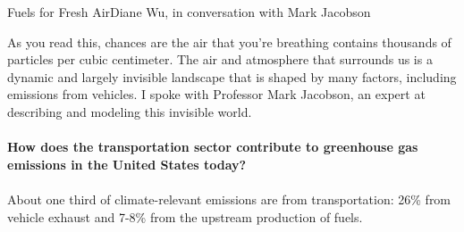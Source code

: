 \documentclass[10pt]{papertex}
\begin{document}
\makeatletter
\renewcommand{\papertex@headDateTime}{
    \raisebox{-5pt}
    {\fontsize{5mm}{6mm}\usefont{T1}{bch}{b}{n}{April 2014}}
    }
\makeatother

\begin{news}{2}{Fuels for Fresh Air}{Diane Wu, in conversation with Mark Jacobson}{}{}

As you read this, chances are the air that you’re breathing contains thousands of particles per cubic centimeter. The air and atmosphere that surrounds us is a dynamic and largely invisible landscape that is shaped by many factors, including emissions from vehicles. I spoke with Professor Mark Jacobson, an expert at describing and modeling this invisible world.
\\
\\
\textbf{How does the transportation sector contribute to greenhouse gas 
    emissions in the United States today?}
\\
\\
About one third of climate-relevant emissions are from transportation: 26\% 
from vehicle exhaust and 7-8\% from the upstream production of fuels.


\end{news}
\end{document}
